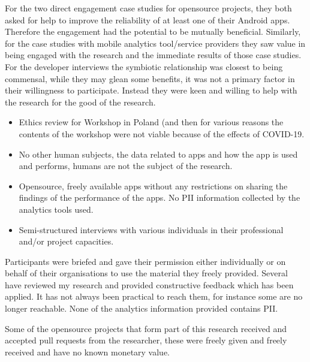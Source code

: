 For the two direct engagement case studies for opensource projects, they both asked for help to improve the reliability of at least one of their Android apps. Therefore the engagement had the potential to be mutually beneficial. Similarly, for the case studies with mobile analytics tool/service providers they saw value in being engaged with the research and the immediate results of those case studies. For the developer interviews the symbiotic relationship was closest to being commensal, while they may glean some benefits, it was not a primary factor in their willingness to participate. Instead they were keen and willing to help with the research for the good of the research. 



\begin{itemize}
    \item Ethics review for Workshop in Poland (and then for various reasons the contents of the workshop were not viable because of the effects of COVID-19.
    \item No other human subjects, the data related to apps and how the app is used and performs, humans are not the subject of the research.
    \item Opensource, freely available apps without any restrictions on sharing the findings of the performance of the apps. No PII information collected by the analytics tools used.
    \item Semi-structured interviews with various individuals in their professional and/or project capacities.
\end{itemize}

Participants were briefed and gave their permission either individually or on behalf of their organisations to use the material they freely provided. Several have reviewed my research and provided constructive feedback which has been applied. 
It has not always been practical to reach them, for instance some are no longer reachable. None of the analytics information provided contains PII.

Some of the opensource projects that form part of this research received and accepted pull requests from the researcher, these were freely given and freely received and have no known monetary value.

